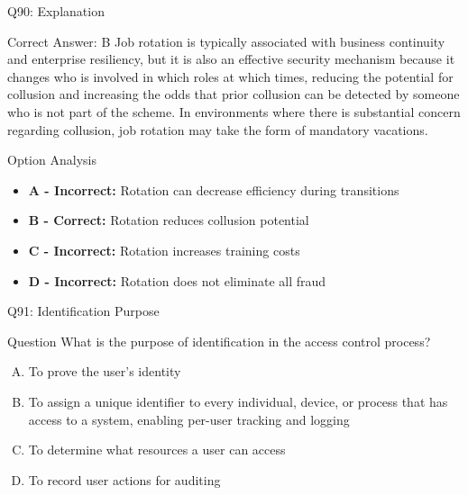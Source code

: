 \documentclass{beamer}
\begin{document}
	\begin{frame}{Q90: Explanation}
		\begin{block}{Correct Answer: B}
			Job rotation is typically associated with business continuity and enterprise resiliency, but it is also an effective security mechanism because it changes who is involved in which roles at which times, reducing the potential for collusion and increasing the odds that prior collusion can be detected by someone who is not part of the scheme. In environments where there is substantial concern regarding collusion, job rotation may take the form of mandatory vacations.
		\end{block}
		\begin{block}{Option Analysis}
			\begin{itemize}
				\item \textbf{A - Incorrect:} Rotation can decrease efficiency during transitions
				\item \textbf{B - Correct:} Rotation reduces collusion potential
				\item \textbf{C - Incorrect:} Rotation increases training costs
				\item \textbf{D - Incorrect:} Rotation does not eliminate all fraud
			\end{itemize}
		\end{block}
	\end{frame}
	
	\begin{frame}{Q91: Identification Purpose}
		\begin{block}{Question}
			What is the purpose of identification in the access control process?
		\end{block}
		\begin{enumerate}[(A)]
			\item To prove the user's identity
			\item To assign a unique identifier to every individual, device, or process that has access to a system, enabling per-user tracking and logging
			\item To determine what resources a user can access
			\item To record user actions for auditing
		\end{enumerate}
	\end{frame}
	
\end{document}
